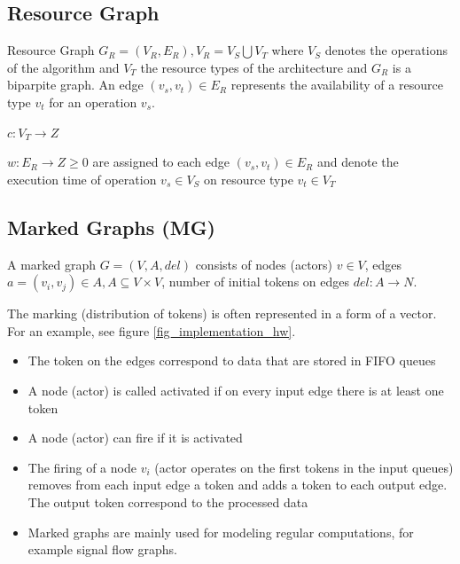\subsection{Resource Graph}
\begin{definition}
Resource Graph $G_R = (V_R, E_R), V_R = V_S \bigcup V_T$ where $V_S$ denotes the operations of the algorithm and $V_T$ the resource types of the architecture and $G_R$ is a biparpite graph. An edge $(v_s, v_t) \in E_R$ represents the availability of a resource type $v_t$ for an operation $v_s$.
\end{definition}

\begin{definition}
$c: V_T \rightarrow Z$
\end{definition}

\begin{definition}
$w: E_R \rightarrow Z \geq 0$ are assigned to each edge $(v_s, v_t) \in E_R$ and denote the execution time of operation $v_s \in V_S$ on resource type $v_t \in V_T$
\end{definition}



\subsection{Marked Graphs (MG)}
\begin{definition}
A marked graph $G = (V, A, del)$ consists of nodes (actors) $v \in V$, edges $a = (v_i, v_j ) \in A, A \subseteq V \times V$, number of initial tokens on edges $del: A \rightarrow N$. 

The marking (distribution of tokens) is often represented in a form of a vector. For an example, see figure \ref{fig_implementation_hw}.
\end{definition}


\begin{itemize}[noitemsep]
\item The token on the edges correspond to data that are stored in FIFO queues
\item A node (actor) is called activated if on every input edge there is at least one token
\item A node (actor) can fire if it is activated
\item The firing of a node $v_i$ (actor operates on the first tokens in the input queues) removes from each input edge a token and adds a token to each output edge. The output token correspond to the processed data
\item Marked graphs are mainly used for modeling 
regular computations, for example signal flow graphs.
\end{itemize}

